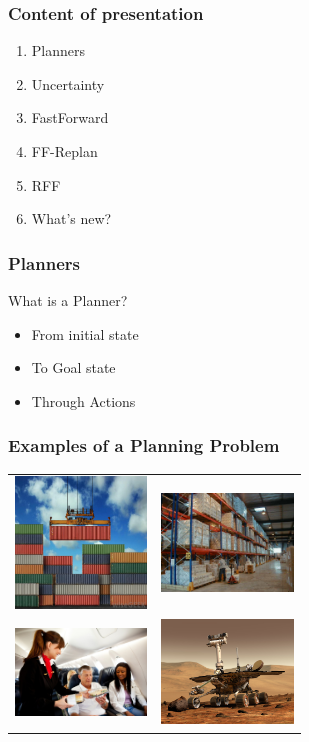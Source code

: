 \documentclass{beamer}
\let\origframetitle=\frametitle
\renewcommand\frametitle[1]{\origframetitle{\textbf{\large{\textrm{#1}}}}}
\begin{document}
\begin{frame}
  \frametitle{Content of presentation}

  \begin{enumerate}
    \item Planners
    \item Uncertainty
    \item FastForward
    \item FF-Replan
    \item RFF
    \item What's new?
  \end{enumerate}

\end{frame}

\begin{frame}
  \frametitle{Planners}

  What is a Planner?

  \begin{itemize}
    \item From \alert{initial state}
    \item To \alert{Goal state}
    \item Through \alert{Actions}
  \end{itemize}

\end{frame}

\begin{frame}
  \frametitle{Examples of a Planning Problem}

  \begin{tabular}{c c}
    \includegraphics[width=3.5cm]{images/containers.jpg}     &
    \includegraphics[width=3.5cm]{images/inventory.jpg}      \\
    \includegraphics[width=3.5cm]{images/airplane-food.jpg}  &
    \includegraphics[width=3.5cm]{images/mars-rover.jpg}
  \end{tabular}

\end{frame}
\end{document}
